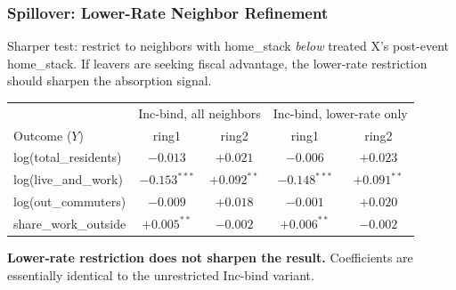 \documentclass[xcolor = x11names, compress, aspectratio = 169]{beamer}
\begin{document}
    \begin{frame}
    \frametitle{Spillover: Lower-Rate Neighbor Refinement}
        \footnotesize
        Sharper test: restrict to neighbors with home\_stack \emph{below} treated
        X's post-event home\_stack. If leavers are seeking fiscal advantage, the
        lower-rate restriction should sharpen the absorption signal.
        \medskip
        \scriptsize
        \renewcommand{\arraystretch}{1.15}
        \setlength{\tabcolsep}{6pt}
        \begin{tabular}{lcc|cc}
            \toprule
            & \multicolumn{2}{c|}{Inc-bind, all neighbors} & \multicolumn{2}{c}{Inc-bind, lower-rate only} \\
            Outcome ($Y$) & ring1 & ring2 & ring1 & ring2 \\
            \midrule
            log(total\_residents) & $-0.013$           & $+0.021$       & $-0.006$            & $+0.023$ \\
            log(live\_and\_work)  & $\bm{-0.153^{***}}$ & $\bm{+0.092^{**}}$ & $\bm{-0.148^{***}}$ & $\bm{+0.091^{**}}$ \\
            log(out\_commuters)   & $-0.009$           & $+0.018$       & $-0.001$            & $+0.020$ \\
            share\_work\_outside  & $\bm{+0.005^{**}}$ & $-0.002$       & $\bm{+0.006^{**}}$  & $-0.002$ \\
            \bottomrule
        \end{tabular}
        \vspace{0.10cm}
        \textbf{Lower-rate restriction does not sharpen the result.} Coefficients
        are essentially identical to the unrestricted Inc-bind variant.
    \end{frame}
\end{document}
